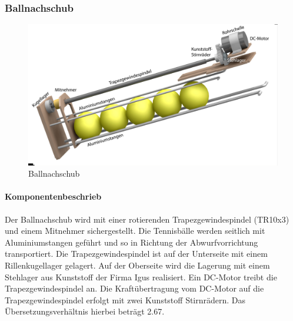 \subsubsection{Ballnachschub}
\begin{figure}[h!]
	\centering
	\includegraphics[width=\linewidth]{../../fig/Render-Ballnachschubx}
	\caption{Ballnachschub}
	\label{fig:Ballnachschub}
\end{figure}
\paragraph{Komponentenbeschrieb\\}
Der Ballnachschub wird mit einer rotierenden Trapezgewindespindel (TR10x3) und einem Mitnehmer sichergestellt. Die Tennisbälle werden seitlich mit Aluminiumstangen geführt und so in Richtung der Abwurfvorrichtung transportiert. Die Trapezgewindespindel ist auf der Unterseite mit einem Rillenkugellager gelagert. Auf der Oberseite wird die Lagerung mit einem Stehlager aus Kunststoff der Firma Igus realisiert. Ein DC-Motor treibt die Trapezgewindespindel an. Die Kraftübertragung vom DC-Motor auf die Trapezgewindespindel erfolgt mit zwei Kunststoff Stirnrädern. Das Übersetzungsverhältnis hierbei beträgt 2.67.

